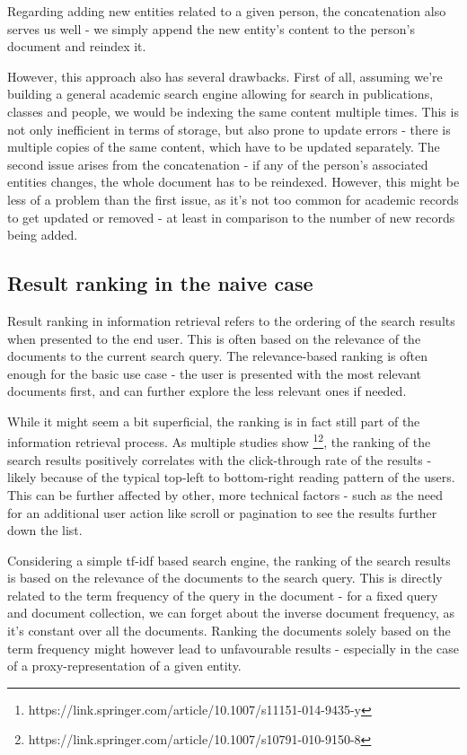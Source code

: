 Regarding adding new entities related to a given person, the concatenation also serves us well - we simply append the new entity's content to the person's document and reindex it.

However, this approach also has several drawbacks. First of all, assuming we're building a general academic search engine allowing for search in publications, classes and people, we would be indexing the same content multiple times.
This is not only inefficient in terms of storage, but also prone to update errors - there is multiple copies of the same content, which have to be updated separately.
The second issue arises from the concatenation - if any of the person's associated entities changes, the whole document has to be reindexed.
However, this might be less of a problem than the first issue, as it's not too common for academic records to get updated or removed - at least in comparison to the number of new records being added.

\subsection{Result ranking in the naive case} \label{search-ranking-issues}

Result ranking in information retrieval refers to the ordering of the search results when presented to the end user. This is often based on the relevance of the documents to the current search query.
The relevance-based ranking is often enough for the basic use case - the user is presented with the most relevant documents first, and can further explore the less relevant ones if needed.

While it might seem a bit superficial, the ranking is in fact still part of the information retrieval process. 
As multiple studies show \footnote{https://link.springer.com/article/10.1007/s11151-014-9435-y}\footnote{https://link.springer.com/article/10.1007/s10791-010-9150-8}, 
the ranking of the search results positively correlates with the click-through rate of the results 
- likely because of the typical top-left to bottom-right reading pattern of the users.
This can be further affected by other, more technical factors - such as the need for an additional user action like scroll or pagination to see the results further down the list.


Considering a simple tf-idf based search engine, the ranking of the search results is based on the relevance of the documents to the search query.
This is directly related to the term frequency of the query in the document - for a fixed query and document collection, we can forget about the inverse document frequency, as it's constant over all the documents.
Ranking the documents solely based on the term frequency might however lead to unfavourable results - especially in the case of a proxy-representation of a given entity.


